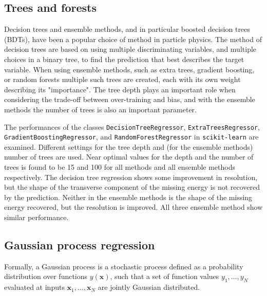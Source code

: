 \documentclass[twocolumn]{scrartcl}
\begin{document}
\subsection{Trees and forests}

Decision trees and ensemble methods, and in particular boosted decision trees (BDTs), have been a popular choice of method in particle physics. The method of decision trees are based on using multiple discriminating variables, and multiple choices in a binary tree, to find the prediction that best describes the target variable. When using ensemble methods, such as extra trees, gradient boosting, or random forests multiple such trees are created, each with its own weight describing its "importance". The tree depth plays an important role when considering the trade-off between over-training and bias, and with the ensemble methods the number of trees is also an important parameter.

The performances of the classes \texttt{DecisionTreeRegressor}, \texttt{ExtraTreesRegressor}, \texttt{GradientBoostingRegressor}, and \texttt{RandomForestRegressor} in \texttt{scikit-learn} are examined. Different settings for the tree depth and (for the ensemble methods) number of trees are used. Near optimal values for the depth and the number of trees is found to be 15 and 100 for all methods and all ensemble methods respectively. The decision tree regression shows some improvement in resolution, but the shape of the transverse component of the missing energy is not recovered by the prediction. Neither in the ensemble methods is the shape of the missing energy recovered, but the resolution is improved. All three ensemble method show similar performance.

\subsection{Gaussian process regression}
Formally, a Gaussian process is a stochastic process defined as a probability distribution over functions $y(\mathbf x)$, such that a set of function values $y_1, \ldots, y_N$ evaluated at inputs $\mathbf x_1, \ldots, \mathbf x_N$ are jointly Gaussian distributed.
\end{document}
